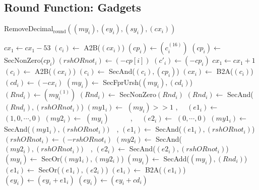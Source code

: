 \documentclass[runningheads]{llncs}
\begin{document}
\newpage
\subsection*{Round Function: Gadgets}

\begin{algorithm}[H]
  \caption{RemoveDecimal$_{\text{round}}((my_i), (ey_i), (sy_i), (cx_i))$}
  $cx_1 \leftarrow cx_1 - 53$
  $(c_i) \leftarrow$ A2B($(cx_i)$)\;
  $(cp_i) \leftarrow (c_i^{(16)})$\;
  $(cp_i) \leftarrow$ SecNonZero($cp_i$)\;
  $(rshORnot_i) \leftarrow (-cp[i])$\; 
  $(c'_i) \leftarrow (- cp_i)$
  $cx_1 \leftarrow cx_1 + 1$\;
  $(c_i) \leftarrow$ A2B($(cx_i)$)\;
  $(c_i) \leftarrow$ SecAnd($(c_i), (cp_i)$)\;
  $(cx_i) \leftarrow$ B2A($(c_i)$)\;
  $(cd_i) \leftarrow (-cx_i)$\;
  $(my_i) \leftarrow$ SecFprUrsh($(my_i), (cd_i)$)
  $(Rnd_i) \leftarrow (my_i^{(1)})$\;
  $(Rnd_i) \leftarrow$ SecNonZero$(Rnd_i)$\;
  $(Rnd_i) \leftarrow$ SecAnd($(Rnd_i), (rshORnot_i)$)\;
  $(my1_i) \leftarrow$ $(my_i)>>1$ , $\quad (e1_i) \leftarrow$ $(1,0,\cdots, 0)$\;
  $(my2_i) \leftarrow$ $(my_i)\qquad \quad$,  $\quad(e2_i) \leftarrow$ $(0,\cdots, 0)$\;
  $(my1_i) \leftarrow$ SecAnd($(my1_i), (rshORnot_i))\quad $, $(e1_i) \leftarrow$ SecAnd($(e1_i), (rshORnot_i)$)\;
  $(rshORnot_i) \leftarrow (-rshORnot_i)$\;
  $(my2_i) \leftarrow$ SecAnd($(my2_i), (rshORnot_i))\quad $, $(e2_i) \leftarrow$ SecAnd($(e2_i), (rshORnot_i)$)\;
  $(my_i) \leftarrow$ SecOr($(my1_i), (my2_i)$)\;
  $(my_i) \leftarrow$ SecAdd($(my_i), (Rnd_i)$)\;
  $(e1_i) \leftarrow$ SecOr($(e1_i), (e2_i)$)\;
  $(e1_i) \leftarrow$ B2A($(e1_i)$)\; 
  $(ey_i) \leftarrow (ey_i + e1_i) $\;
  $(ey_i) \leftarrow (ey_i + cd_i)$\; 
\;
\end{algorithm}
\end{document}
